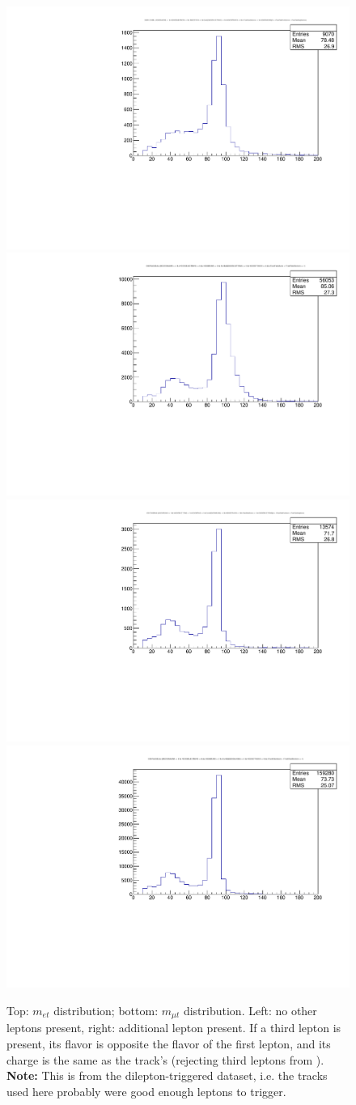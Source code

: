 \begin{figure}
\begin{center}
	\includegraphics[width=.5\textwidth]{Appendix/study_OSSFCLOSEMLL_electron,track_1fake}%
	\includegraphics[width=.5\textwidth]{Appendix/study_OSSFCLOSEMLL_electron,track_dileptons-1fake}\\
	\includegraphics[width=.5\textwidth]{Appendix/study_OSSFCLOSEMLL_muon,track_1fake}%
	\includegraphics[width=.5\textwidth]{Appendix/study_OSSFCLOSEMLL_muon,track_dileptons-1fake}
	\caption{Top: $m_{et}$ distribution; bottom: $m_{\mu t}$ distribution. Left: no other leptons present, right: additional lepton present. If a third lepton is present, its flavor is opposite the flavor of the first lepton, and its charge is the same as the track's (rejecting third leptons from \Z).\\
	\textbf{Note:} This is from the dilepton-triggered dataset, i.e. the tracks used here probably were good enough leptons to trigger.
	\label{fig:app:MOSSFlepton,track}}
\end{center}
\end{figure}

